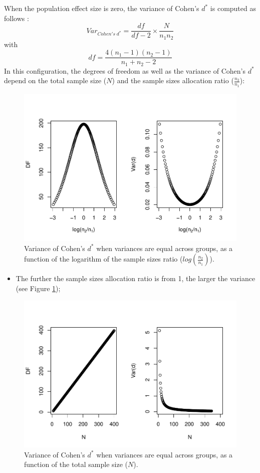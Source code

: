 \documentclass[
  english,
  man,mask]{apa6}
\providecommand{\tightlist}{%
  \setlength{\itemsep}{0pt}\setlength{\parskip}{0pt}}
\begin{document}
When the population effect size is zero, the variance of Cohen's \(d^*\) is computed as follows :
\[Var_{Cohen's \; d^*} = \frac{df}{df-2} \times \frac{N}{n_1n_2}\]
with \[df = \frac{4(n_1-1)(n_2-1)}{n_1+n_2-2}\]
In this configuration, the degrees of freedom as well as the variance of Cohen's \(d^*\) depend on the total sample size (\(N\)) and the sample sizes allocation ratio (\(\frac{n_2}{n_1}\)):

\begin{figure}
\centering
\includegraphics{SupMat1_files/figure-latex/varcohendprimeHomNratio2-1.pdf}
\caption{\label{fig:varcohendprimeHomNratio2}Variance of Cohen's \(d^*\) when variances are equal across groups, as a function of the logarithm of the sample sizes ratio (\(log\left(\frac{n_2}{n_1} \right)\)).}
\end{figure}

\begin{itemize}
\tightlist
\item
  The further the sample sizes allocation ratio is from 1, the larger the variance (see Figure \ref{fig:varcohendprimeHomNratio2});
\end{itemize}

\begin{figure}
\centering
\includegraphics{SupMat1_files/figure-latex/varcohendprimehomNsize2-1.pdf}
\caption{\label{fig:varcohendprimehomNsize2}Variance of Cohen's \(d^*\) when variances are equal across groups, as a function of the total sample size (\(N\)).}
\end{figure}
\end{document}

